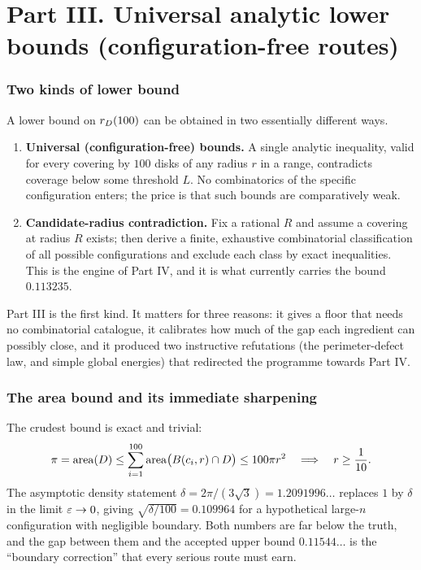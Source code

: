 \part*{Part III. Universal analytic lower bounds (configuration-free routes)}
\setcounter{section}{0}

\section{Two kinds of lower bound}

A lower bound on $r_{D}(100)$ can be obtained in two essentially different ways.

\begin{enumerate}[leftmargin=1.6em,itemsep=3pt]
\item \textbf{Universal (configuration-free) bounds.} A single analytic inequality, valid for every
covering by $100$ disks of any radius $r$ in a range, contradicts coverage below some threshold
$L$. No combinatorics of the specific configuration enters; the price is that such bounds are
comparatively weak.
\item \textbf{Candidate-radius contradiction.} Fix a rational $R$ and assume a covering at radius
$R$ exists; then derive a finite, exhaustive combinatorial classification of all possible
configurations and exclude each class by exact inequalities. This is the engine of Part IV, and it
is what currently carries the bound $0.113235$.
\end{enumerate}

Part III is the first kind. It matters for three reasons: it gives a floor that needs no
combinatorial catalogue, it calibrates how much of the gap each ingredient can possibly close, and
it produced two instructive refutations (the perimeter-defect law, and simple global energies) that
redirected the programme towards Part IV.

\section{The area bound and its immediate sharpening}

The crudest bound is exact and trivial:
\[
\pi=\operatorname{area}(D)\le\sum_{i=1}^{100}\operatorname{area}\bigl(B(c_i,r)\cap D\bigr)\le100\pi r^2
\quad\Longrightarrow\quad r\ge\frac1{10}.
\]
The asymptotic density statement $\delta=2\pi/(3\sqrt3)=1.2091996\ldots$ replaces $1$ by
$\delta$ in the limit $\varepsilon\to0$, giving $\sqrt{\delta/100}=0.109964$ for a hypothetical
large-$n$ configuration with negligible boundary. Both numbers are far below the truth, and the
gap between them and the accepted upper bound $0.11544\ldots$ is the ``boundary correction'' that
every serious route must earn.

